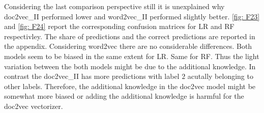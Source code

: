 \documentclass[12pt, a4paper, titlepage]{article}
\begin{document}

Considering the last comparison perspective still it is unexplained why doc2vec\_II performed lower and word2vec\_II performed slightly better. \ref{fig: F23} and \ref{fig: F24} report the corresponding confusion matrices for \ac{LR} and \ac{RF} respectivley. The share of predictions and the correct predictions are reported in the appendix. Considering word2vec there are no considerable differences. Both models seem to be biased in the same extent for \ac{LR}. Same for \ac{RF}. Thus the light variation between the both models might be due to the additional knowledge. In contrast the doc2vec\_II has more predictions with label $2$ acutally belonging to other labels. Therefore, the additional knowledge in the doc2vec model might be somewhat more biased or adding the additional knowledge is harmful for the doc2vec vectorizer. 
\end{document}
